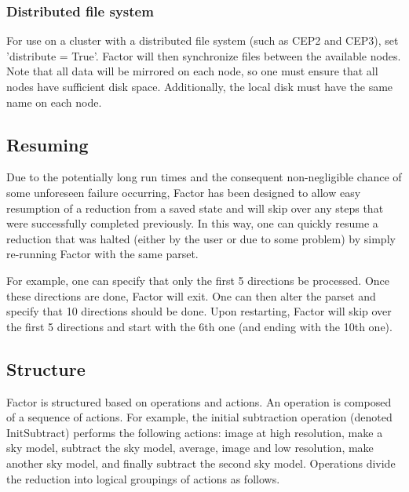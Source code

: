 \documentclass[structabstract]{article}
\begin{document}
{\subsubsection{Distributed file system}
For use on a cluster with a distributed file system (such as CEP2 and CEP3), set
'distribute = True'. Factor will then synchronize files between the available
nodes. Note that all data will be mirrored on each node, so one must ensure that
all nodes have sufficient disk space. Additionally, the local disk must have the
same name on each node.


\subsection{Resuming}
\label{factor:resuming}

Due to the potentially long run times and the consequent non-negligible chance
of some unforeseen failure occurring, Factor has been designed to allow easy
resumption of a reduction from a saved state and will skip over any steps that
were successfully completed previously. In this way, one can quickly resume a
reduction that was halted (either by the user or due to some problem) by simply
re-running Factor with the same parset.

For example, one can specify that only the first 5 directions be processed.
Once these directions are done, Factor will exit. One can then alter the parset
and specify that 10 directions should be done. Upon restarting, Factor will skip
over the first 5 directions and start with the 6th one (and ending with the 10th
one).


\subsection{Structure}
\label{factor:structure}

Factor is structured based on operations and actions. An operation is composed
of a sequence of actions. For example, the initial subtraction operation
(denoted InitSubtract) performs the following actions: image at high resolution,
make a sky model, subtract the sky model, average, image and low resolution,
make another sky model, and finally subtract the second sky model. Operations
divide the reduction into logical groupings of actions as follows.

}
\end{document}
